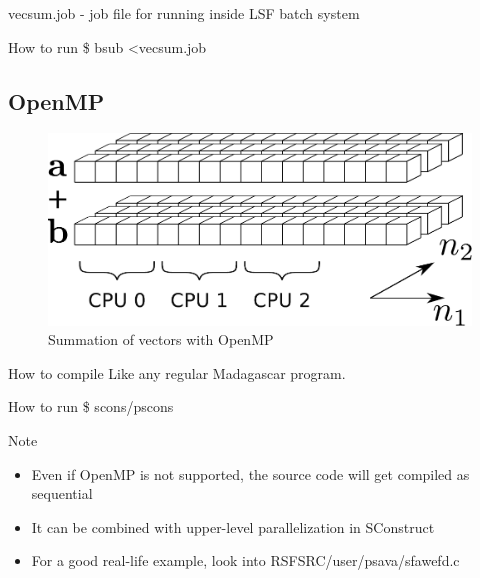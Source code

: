 \begin{frame}
  \begin{block}{vecsum.job - job file for running inside LSF batch system}
  
  \end{block}
  \begin{block}{How to run}
    \$ bsub \textless vecsum.job
  \end{block}
\end{frame}

\subsection{OpenMP}

\begin{frame}
  \vspace{1.0cm}
  \begin{figure}
  \includegraphics[scale=0.55]{Fig/abcomp.pdf}
  \caption{Summation of vectors with OpenMP}
  \end{figure}
\end{frame}

\begin{frame}
\end{frame}
\begin{frame}
\end{frame}

\begin{frame}
  \begin{block}{How to compile}
    Like any regular Madagascar program. 
  \end{block}
  \begin{block}{How to run}
    \$ scons/pscons
  \end{block}
  \begin{block}{Note}
    \begin{itemize}
      \item Even if OpenMP is not supported, the source code will get
compiled as sequential
      \item It can be combined with upper-level parallelization in SConstruct
      \item For a good real-life example, look into RSFSRC/user/psava/sfawefd.c
    \end{itemize}
  \end{block}
\end{frame}

